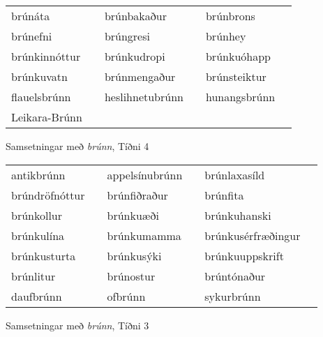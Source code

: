\documentclass[../samsetningasafn.tex]{subfiles}
\begin{document}
\begin{wordlist}[H]
\begin{tcolorbox}

	\setlength{\extrarowheight}{3pt}
	\begin{tabular}{BlBlBl}	
		brúnáta		& 	\phantom{baa}	& 		
		brúnbakaður	&	\phantom{baa}	& 	
		brúnbrons	&	\phantom{baa}	\\ 	
		brúnefni		&		& 	
		brúngresi	&		& 	
		brúnhey		& 		\\ 	
		brúnkinnóttur &		& 	
		brúnkudropi	&		& 	
		brúnkuóhapp	&		\\ 	
		brúnkuvatn	&		& 	
		brúnmengaður &		& 	
		brúnsteiktur	&		\\ 	
		flauelsbrúnn	&		& 
		heslihnetubrúnn & 	& 
		hunangsbrúnn & 		\\ 	
		Leikara-Brúnn &		& 	
						&	&
						&
	\end{tabular}

\end{tcolorbox}
	\caption{Samsetningar með \textit{brúnn}, Tíðni 4}
	\label{listi:brunt.4}
\end{wordlist}

\begin{wordlist}[H]
\begin{tcolorbox}

	\setlength{\extrarowheight}{3pt}
	\begin{tabular}{BlBlBl}	
		antikbrúnn		&		& 	
		appelsínubrúnn	&		& 		
		brúnlaxasíld		&		\\ 	
		brúndröfnóttur	&		& 	
		brúnfiðraður		&		& 	
		brúnfita			&		\\ 
		brúnkollur		&		& 	
		brúnkuæði		&		& 	
		brúnkuhanski	&		\\ 	
		brúnkulína		&		& 	
		brúnkumamma	&		& 	
		brúnkusérfræðingur &	\\ 
		brúnkusturta		&		& 	
		brúnkusýki		&		& 	
		brúnkuuppskrift	&		\\ 
		brúnlitur			&		& 
		brúnostur		&		& 
		brúntónaður		&		\\ 	
		daufbrúnn		&		& 	
		ofbrúnn			&		& 	
		sykurbrúnn		&		 		
	\end{tabular}

\end{tcolorbox}
	\caption{Samsetningar með \textit{brúnn}, Tíðni 3}
	\label{listi:brunt.3}
\end{wordlist}
\end{document}
